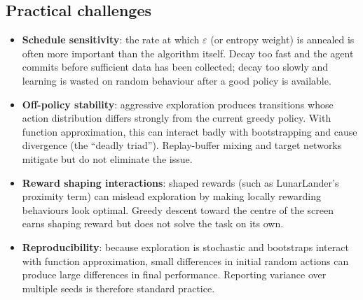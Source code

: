 \documentclass[11pt,a4paper]{article}
\begin{document}
\subsection{Practical challenges}
\begin{itemize}
  \item \textbf{Schedule sensitivity}: the rate at which $\varepsilon$
    (or entropy weight) is annealed is often more important than the
    algorithm itself. Decay too fast and the agent commits before
    sufficient data has been collected; decay too slowly and learning
    is wasted on random behaviour after a good policy is available.
  \item \textbf{Off-policy stability}: aggressive exploration produces
    transitions whose action distribution differs strongly from the
    current greedy policy. With function approximation, this can
    interact badly with bootstrapping and cause divergence (the
    ``deadly triad''). Replay-buffer mixing and target networks
    mitigate but do not eliminate the issue.
  \item \textbf{Reward shaping interactions}: shaped rewards (such as
    LunarLander's proximity term) can mislead exploration by making
    locally rewarding behaviours look optimal. Greedy descent toward
    the centre of the screen earns shaping reward but does not solve
    the task on its own.
  \item \textbf{Reproducibility}: because exploration is stochastic and
    bootstraps interact with function approximation, small differences
    in initial random actions can produce large differences in final
    performance. Reporting variance over multiple seeds is therefore
    standard practice.
\end{itemize}
\end{document}

